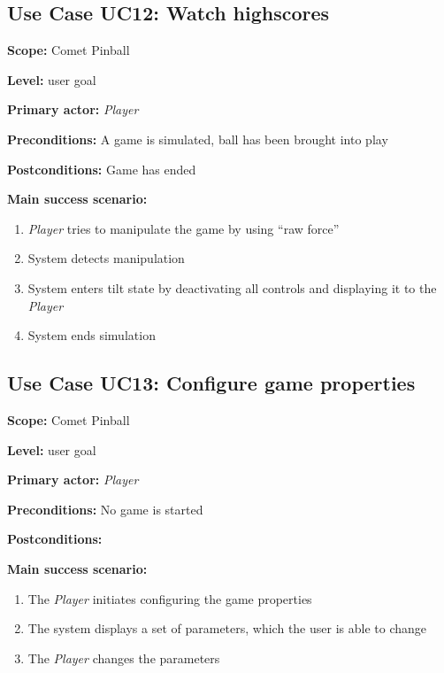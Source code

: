\documentclass[fontsize=12pt,
               paper=a4,
               twoside=false,
               parskip=half,
               ]{scrartcl}
\begin{document}


\subsection{Use Case UC12: Watch highscores }

\textbf{\textsf{Scope:}} Comet Pinball

\textbf{\textsf{Level:}} user goal

\textbf{\textsf{Primary actor:}} \emph{Player}

\textbf{\textsf{Preconditions:}} A game is simulated, ball has been brought into play

\textbf{\textsf{Postconditions:}} Game has ended

\textbf{\textsf{Main success scenario:}}

\begin{enumerate}[leftmargin=3em]
	\item \emph{Player} tries to manipulate the game by using \enquote{raw force}
	\item System detects manipulation
	\item System enters tilt state by deactivating all controls and displaying it to the \emph{Player}
	\item System ends simulation
\end{enumerate}




\subsection{Use Case UC13: Configure game properties }

\textbf{\textsf{Scope:}} Comet Pinball

\textbf{\textsf{Level:}} user goal

\textbf{\textsf{Primary actor:}} \emph{Player}

\textbf{\textsf{Preconditions:}} No game is started

\textbf{\textsf{Postconditions:}} 

\textbf{\textsf{Main success scenario:}}

\begin{enumerate}[leftmargin=3em]
	\item The \emph{Player} initiates configuring the game properties
	\item The system displays a set of parameters, which the user is able to change
	\item The \emph{Player} changes the parameters
\end{enumerate}
\end{document}
